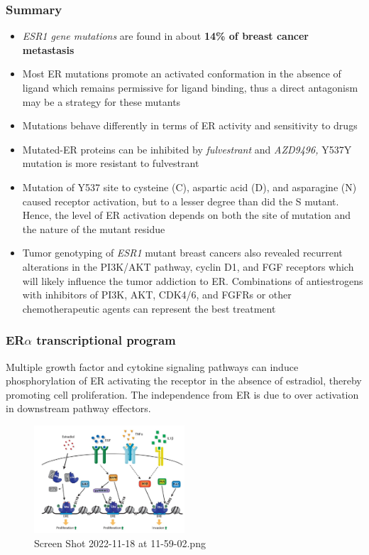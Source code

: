 \hypertarget{summary}{%
\subsubsection{Summary}\label{summary}}

\begin{itemize}
\tightlist
\item
  \emph{ESR1 gene mutations} are found in about \textbf{14\% of breast cancer metastasis}
\item
  Most ER mutations promote an activated conformation in the absence of ligand which remains
  permissive for ligand binding, thus a direct antagonism may be a strategy for these mutants
\item
  Mutations behave differently in terms of ER activity and sensitivity to drugs
\item
  Mutated-ER proteins can be inhibited by \emph{fulvestrant} and \emph{AZD9496,} Y537Y mutation is more resistant to fulvestrant
\item
  Mutation of Y537 site to cysteine (C), aspartic acid (D), and asparagine (N) caused receptor
  activation, but to a lesser degree than did the S mutant. Hence, the level of ER activation depends on both the site of mutation and the nature of the mutant residue
\item
  Tumor genotyping of \emph{ESR1} mutant breast cancers also revealed recurrent alterations in the
  PI3K/AKT pathway, cyclin D1, and FGF receptors which will likely influence the tumor addiction to ER. Combinations of antiestrogens with inhibitors of PI3K, AKT, CDK4/6, and FGFRs or other chemotherapeutic agents can represent the best treatment
\end{itemize}

\hypertarget{ertranscriptional-program}{%
\subsubsection{\texorpdfstring{ER$\alpha$ transcriptional program}{ERtranscriptional program}}\label{ertranscriptional-program}}

Multiple growth factor and cytokine signaling pathways can induce phosphorylation of ER activating the receptor in the absence of estradiol, thereby promoting cell proliferation. The independence from ER is due to over activation in downstream pathway effectors.

\begin{figure}
\centering
\includegraphics[width=0.5\textwidth]{../_resources/Screen_Shot_2022-11-18_at_11-59-02.png}
\caption{Screen Shot 2022-11-18 at 11-59-02.png}
\end{figure}

